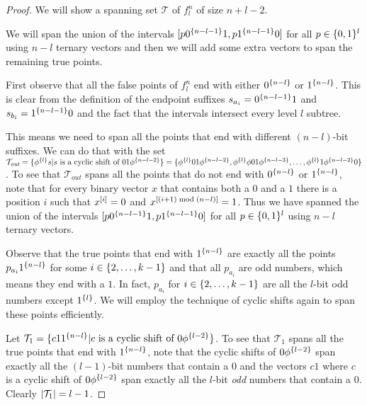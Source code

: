 \begin{proof}
We will show a spanning set $\mathcal{T}$
of $f_l^n$ of size $n+l-2$.

We will span the union of the intervals
$[p 0^{\{n-l-1\}} 1, p 1^{\{n-l-1\}} 0]$
for all $p \in \{0, 1\}^l$
using $n-l$ ternary vectors
and then we will add some extra
vectors
to span the remaining true points.

First observe that all the false points of $f_l^n$
end with either $0^{\{n-l\}}$ or $1^{\{n-l\}}$.
This is clear from the definition
of the  endpoint suffixes
$s_{a_i} = 0^{\{n-l-1\}} 1$
and $s_{b_i} = 1^{\{n-l-1\}} 0$
and the fact that the intervals intersect every
level $l$ subtree.

This means we need to span all the points that end
with different $(n-l)$-bit suffixes.
We can do that with the set
$\mathcal{T}_{\mathit{out}}
= \{\phi^{\{l\}} s
| s \text{ is a cyclic shift of } 01 \phi^{\{n-l-2\}}\}
= \{
\phi^{\{l\}} 01 \phi^{\{n-l-2\}},
\phi^{\{l\}} \phi 01 \phi^{\{n-l-3\}},
\ldots,
\phi^{\{l\}} 1 \phi^{\{n-l-2\}} 0
\}
$.
To see that $\mathcal{T}_{\mathit{out}}$
spans all the points
that do not end with $0^{\{n-l\}}$ or $1^{\{n-l\}}$,
note that for every binary vector $x$
that contains both a $0$ and a $1$
there is a position $i$
such that $x^{[i]} = 0$
and $x^{[(i+1) \bmod (n-l)]} = 1$.
Thus we have spanned the union of the intervals
$[p 0^{\{n-l-1\}} 1, p 1^{\{n-l-1\}} 0]$
for all $p \in \{0, 1\}^l$
using $n-l$ ternary vectors.

Observe that
the true points
that end with $1^{\{n-l\}}$
are exactly all the points $p_{a_i} 1^{\{n-l\}}$
for some $i \in \{2, \ldots, k-1\}$
and that all $p_{a_i}$ are odd numbers,
which means they end with a $1$.
In fact,
$p_{a_i}$ for $i \in \{2, \ldots, k-1\}$
are all the $l$-bit odd numbers except $1^{\{l\}}$.
We will employ the technique of cyclic shifts
again
to span these points efficiently.

Let $\mathcal{T}_1 = \{c 1 1^{\{n-l\}}
| c \text{ is a cyclic shift of } 0 \phi^{\{l-2\}}\}$.
To see that $\mathcal{T}_1$ spans all the true points
that end with $1^{\{n-l\}}$,
note that the cyclic shifts of $0 \phi^{\{l-2\}}$
span exactly all the $(l-1)$-bit numbers that contain a $0$
and the vectors $c 1$
where $c$ is a cyclic shift of $0 \phi^{\{l-2\}}$
span exactly all the $l$-bit \emph{odd} numbers
that contain a $0$.
Clearly $\lvert\mathcal{T}_1\rvert = l-1$.


\end{proof}
